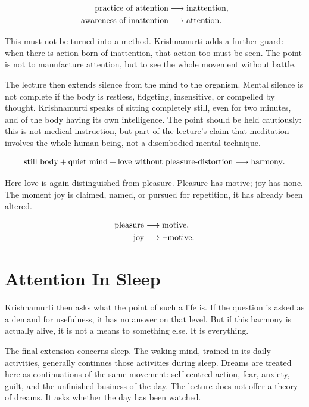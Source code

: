 \documentclass[11pt,oneside]{book}
\begin{document}
\begin{align}
\hbox{practice of attention} &\longrightarrow \hbox{inattention},\\
\hbox{awareness of inattention} &\longrightarrow \hbox{attention}.
\end{align}

This must not be turned into a method. Krishnamurti adds a further guard: when there is action born of inattention, that action too must be seen. The point is not to manufacture attention, but to see the whole movement without battle.

The lecture then extends silence from the mind to the organism. Mental silence is not complete if the body is restless, fidgeting, insensitive, or compelled by thought. Krishnamurti speaks of sitting completely still, even for two minutes, and of the body having its own intelligence. The point should be held cautiously: this is not medical instruction, but part of the lecture's claim that meditation involves the whole human being, not a disembodied mental technique.

\begin{equation}
\hbox{still body}
+
\hbox{quiet mind}
+
\hbox{love without pleasure-distortion}
\longrightarrow
\hbox{harmony}.
\end{equation}

Here love is again distinguished from pleasure. Pleasure has motive; joy has none. The moment joy is claimed, named, or pursued for repetition, it has already been altered.

\begin{align}
\hbox{pleasure} &\longrightarrow \hbox{motive},\\
\hbox{joy} &\longrightarrow \neg \hbox{motive}.
\end{align}

\section{Attention In Sleep}

Krishnamurti then asks what the point of such a life is. If the question is asked as a demand for usefulness, it has no answer on that level. But if this harmony is actually alive, it is not a means to something else. It is everything.

The final extension concerns sleep. The waking mind, trained in its daily activities, generally continues those activities during sleep. Dreams are treated here as continuations of the same movement: self-centred action, fear, anxiety, guilt, and the unfinished business of the day. The lecture does not offer a theory of dreams. It asks whether the day has been watched.
\end{document}
